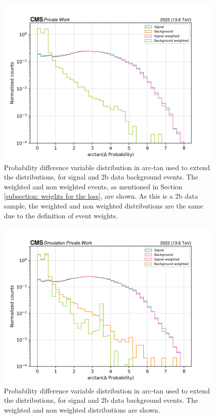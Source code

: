 \begin{figure}[hbt]
    \centering
    \includegraphics[width=0.7\linewidth]{Images/7.S:B/Prob diff/2b data reduced.png}
    \caption{Probability difference variable distribution in arc-tan used to extend the distributions, for signal and 2b data background events. The weighted and non weighted events, as mentioned in Section \ref{subsection: weights for the loss}, are shown. As this is a 2b data sample, the weighted and non weighted distributions are the same due to the definition of event weights.}
    \label{fig: 2b data PD}
\end{figure}

\begin{figure}
    \centering
    \includegraphics[width=0.7\linewidth]{Images/7.S:B/Prob diff/2b QCD arctan.png}
    \caption{Probability difference variable distribution in arc-tan used to extend the distributions, for signal and 2b data background events. The weighted and non weighted distributions are shown.}
    \label{fig: 2b QCD PD}
\end{figure}


